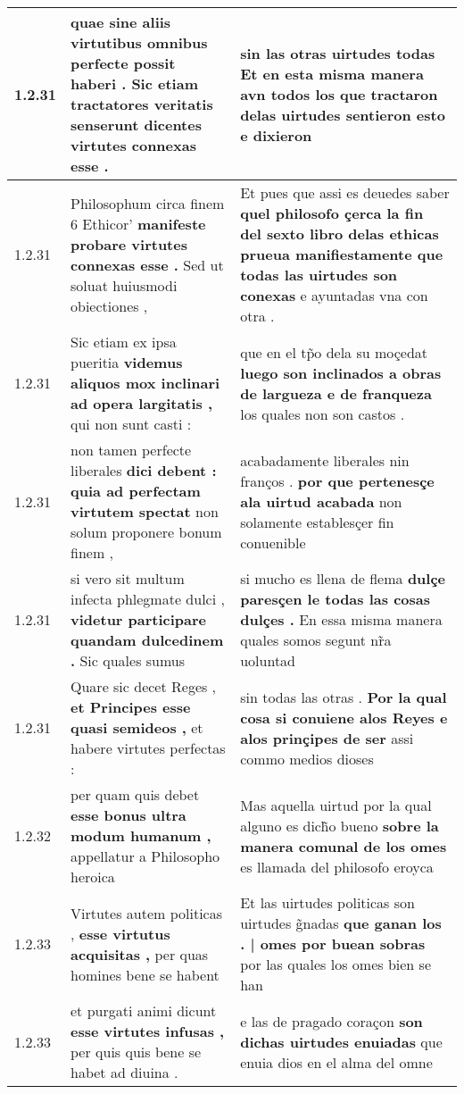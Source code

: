 \begin{tabular}{|p{1cm}|p{6.5cm}|p{6.5cm}|}
1.2.31 & quae sine aliis virtutibus \textbf{ omnibus perfecte possit haberi . Sic etiam tractatores veritatis senserunt } dicentes virtutes connexas esse . & sin las otras uirtudes todas \textbf{ Et en esta misma manera avn todos los que tractaron delas uirtudes sentieron esto } e dixieron \\\hline
1.2.31 & Philosophum circa finem 6 Ethicor’ \textbf{ manifeste probare virtutes connexas esse . } Sed ut soluat huiusmodi obiectiones , & Et pues que assi es deuedes saber \textbf{ quel philosofo çerca la fin del sexto libro delas ethicas prueua manifiestamente que todas las uirtudes son conexas } e ayuntadas vna con otra . \\\hline
1.2.31 & Sic etiam ex ipsa pueritia \textbf{ videmus aliquos mox inclinari ad opera largitatis , } qui non sunt casti : & que en el tp̃o dela su moçedat \textbf{ luego son inclinados a obras de largueza e de franqueza } los quales non son castos . \\\hline
1.2.31 & non tamen perfecte liberales \textbf{ dici debent : quia ad perfectam virtutem spectat } non solum proponere bonum finem , & acabadamente liberales nin franços . \textbf{ por que pertenesçe ala uirtud acabada } non solamente establesçer fin conuenible \\\hline
1.2.31 & si vero sit multum infecta phlegmate dulci , \textbf{ videtur participare quandam dulcedinem . } Sic quales sumus & si mucho es llena de flema \textbf{ dulçe paresçen le todas las cosas dulçes . } En essa misma manera quales somos segunt nr̃a uoluntad \\\hline
1.2.31 & Quare sic decet Reges , \textbf{ et Principes esse quasi semideos , } et habere virtutes perfectas : & sin todas las otras . \textbf{ Por la qual cosa si conuiene alos Reyes e alos prinçipes de ser } assi commo medios dioses \\\hline
1.2.32 & per quam quis debet \textbf{ esse bonus ultra modum humanum , } appellatur a Philosopho heroica & Mas aquella uirtud por la qual alguno es dich̃o bueno \textbf{ sobre la manera comunal de los omes } es llamada del philosofo eroyca \\\hline
1.2.33 & Virtutes autem politicas , \textbf{ esse virtutus acquisitas , } per quas homines bene se habent & Et las uirtudes politicas son uirtudes g̃nadas \textbf{ que ganan los . | omes por buean sobras } por las quales los omes bien se han \\\hline
1.2.33 & et purgati animi dicunt \textbf{ esse virtutes infusas , } per quis quis bene se habet ad diuina . & e las de pragado coraçon \textbf{ son dichas uirtudes enuiadas } que enuia dios en el alma del omne \\\hline

\end{tabular}
